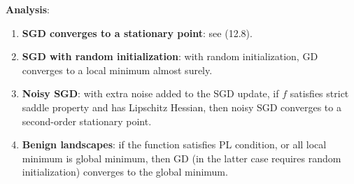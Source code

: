 \textbf{Analysis}:
\begin{enumerate}
    \item \textbf{SGD converges to a stationary point}: see (12.8).
    \item \textbf{SGD with random initialization}: with random initialization, GD converges to a local minimum almost surely.
    \item \textbf{Noisy SGD}: with extra noise added to the SGD update, if $f$ satisfies strict saddle property and has Lipschitz Hessian, then noisy SGD converges to a second-order stationary point.
    \item \textbf{Benign landscapes}: if the function satisfies PL condition, or all local minimum is global minimum, then GD (in the latter case requires random initialization) converges to the global minimum.
\end{enumerate}